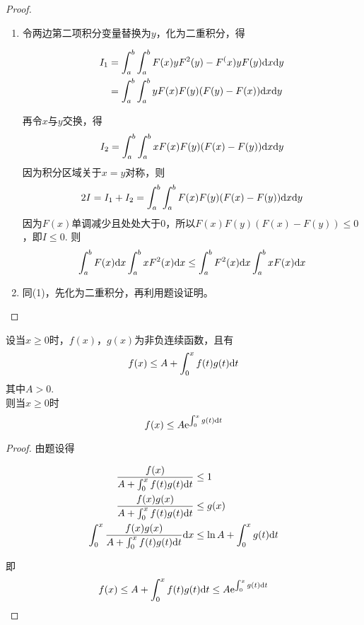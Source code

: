\begin{proof}
    
    \begin{enumerate}

        \item
            令两边第二项积分变量替换为$y$，化为二重积分，得
        
            \begin{align*}
                I_1 &= \int_{a}^{b}{\int_{a}^{b}{F(x)yF^2(y)-F^(x)yF(y)}\mathrm{d} x}\mathrm{d} y\\
                &= \int_{a}^{b}{\int_{a}^{b}{yF(x)F(y)(F(y)-F(x))}\mathrm{d} x}\mathrm{d} y
            \end{align*}

            再令$x$与$y$交换，得
            $$I_2 = \int_{a}^{b}{\int_{a}^{b}{xF(x)F(y)(F(x)-F(y))}\mathrm{d} x}\mathrm{d} y$$
            因为积分区域关于$x=y$对称，则
            $$2I = I_1 + I_2 =  \int_{a}^{b}{\int_{a}^{b}{F(x)F(y)(F(x)-F(y))}\mathrm{d} x}\mathrm{d} y$$
            因为$F(x)$单调减少且处处大于$0$，所以$F(x)F(y)(F(x)-F(y)) \leq 0$，即$I\leq 0$.
            则
            $$ \int_{a}^{b}{F(x)}\mathrm{d} x\int_{a}^{b}{xF^2(x)}\mathrm{d} x \leq \int_{a}^{b}{F^2(x)}\mathrm{d} x \int_{a}^{b}{xF(x)}\mathrm{d} x $$

        \item 同\textup{(1)}，先化为二重积分，再利用题设证明。
        
    \end{enumerate}

\end{proof}

\begin{theorem}

    设当$x\geq 0$时，$f(x)$，$g(x)$为非负连续函数，且有
    $$f(x)\leq A + \int_{0}^{x}{f(t)g(t)}\mathrm{d} t$$
    其中$A>0$.\\
    则当$x\geq 0$时
    $$ f(x) \leq A \mathrm{e}^{\int_{0}^{x}{g(t)}\mathrm{d} t} $$

\end{theorem}

\begin{proof}

    由题设得

    \begin{align*}
        \dfrac{f(x)}{A+\int_{0}^{x}{f(t)g(t)}\mathrm{d} t} & \leq 1\\
        \dfrac{f(x)g(x)}{A+\int_{0}^{x}{f(t)g(t)}\mathrm{d} t} & \leq g(x)\\
        \int_{0}^{x}{\dfrac{f(x)g(x)}{A+\int_{0}^{x}{f(t)g(t)}\mathrm{d} t}}\mathrm{d} x & \leq \ln A + \int_{0}^{x}{g(t)}\mathrm{d} t
    \end{align*}

    即
    $$f(x)\leq A+\int_{0}^{x}{f(t)g(t)}\mathrm{d} t \leq A \mathrm{e}^{\int_{0}^{x}{g(t)}\mathrm{d} t} $$

\end{proof}

